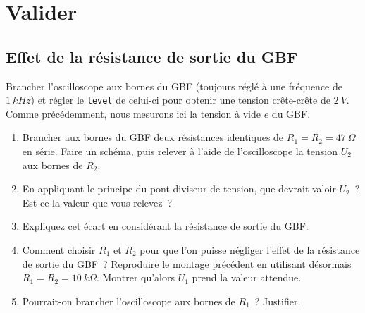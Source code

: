 \documentclass[../main/main.tex]{subfiles}
\begin{document}
\section{Valider} %
\subsection{Effet de la résistance de sortie du GBF}

Brancher l'oscilloscope aux bornes du GBF (toujours réglé à une fréquence de
$\SI{1}{kHz}$) et régler le \texttt{level} de celui-ci pour obtenir une tension
crête-crête de $\SI{2}{V}$. Comme précédemment, nous mesurons ici la tension à
vide $e$ du GBF.

\noindent
\begin{minipage}[t]{.65\linewidth}
	\begin{enumerate}[label=\sqenumi, start=10]
		\item Brancher aux bornes du GBF deux résistances identiques de
		      $R_1 = R_2 = \SI{47}{\Omega}$ en série. Faire un schéma, puis relever
		      à l'aide de l'oscilloscope la tension $U_2$ aux bornes de $R_2$.
		\item En appliquant le principe du pont diviseur de tension, que devrait
		      valoir $U_2$~? Est-ce la valeur que vous relevez~?
		\item Expliquez cet écart en considérant la résistance de sortie du GBF.
		\item Comment choisir $R_1$ et $R_2$ pour que l'on puisse négliger l'effet
		      de la résistance de sortie du GBF~? Reproduire le montage précédent en
		      utilisant désormais $R_1 = R_2 = \SI{10}{k\Omega}$. Montrer qu'alors
		      $U_1$ prend la valeur attendue.
		\item Pourrait-on brancher l’oscilloscope aux bornes de $R_1$~? Justifier.
	\end{enumerate}
\end{minipage}
\hfill
\end{document}
